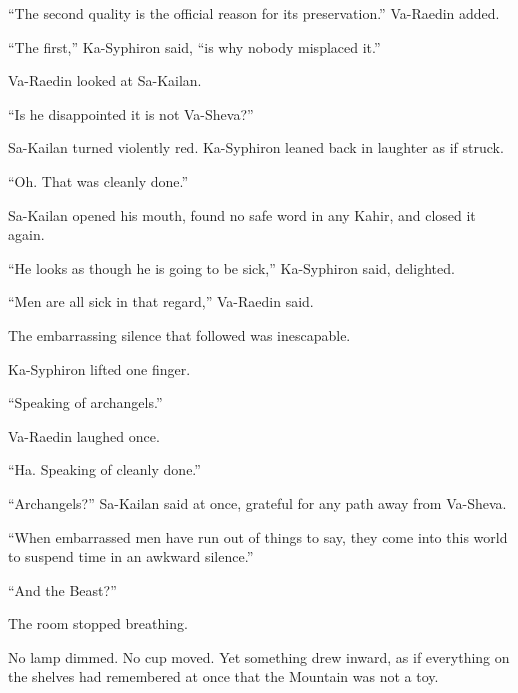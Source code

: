 “The second quality is the official reason for its preservation.” Va-Raedin added. \par

“The first,” Ka-Syphiron said, “is why nobody misplaced it.”\par

Va-Raedin looked at Sa-Kailan.\par

“Is he disappointed it is not Va-Sheva?”\par

Sa-Kailan turned violently red.
Ka-Syphiron leaned back in laughter as if struck.\par

“Oh.
That was cleanly done.”\par

Sa-Kailan opened his mouth, found no safe word in any Kahir, and closed it again.\par

“He looks as though he is going to be sick,” Ka-Syphiron said, delighted.\par

“Men are all sick in that regard,” Va-Raedin said.\par

The embarrassing silence that followed was inescapable.\par




Ka-Syphiron lifted one finger.\par

“Speaking of archangels.”\par

Va-Raedin laughed once.\par

“Ha.
Speaking of cleanly done.”\par

“Archangels?” Sa-Kailan said at once, grateful for any path away from Va-Sheva.\par

“When embarrassed men have run out of things to say, they come into this world to suspend time in an awkward silence.”\par




“And the Beast?”\par

The room stopped breathing.\par

No lamp dimmed.
No cup moved.
Yet something drew inward, as if everything on the shelves had remembered at once that the Mountain was not a toy.\par

